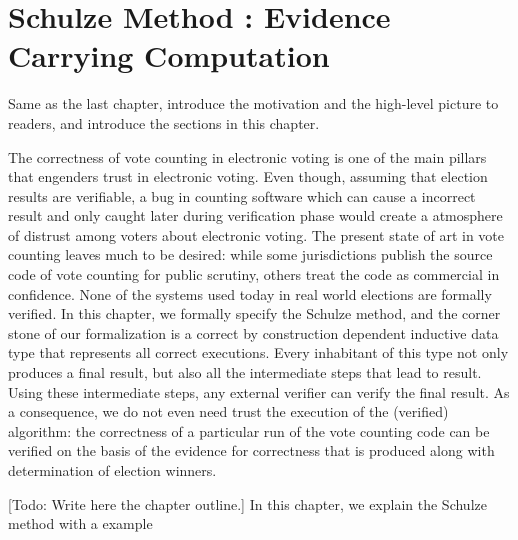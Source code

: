 \chapter{Schulze Method : Evidence Carrying Computation}
\label{cha:schulze_method}
Same as the last chapter, introduce the motivation and the high-level picture to
readers, and introduce the sections in this chapter.

 The correctness of vote counting in electronic voting is one of 
 the main pillars that engenders trust in electronic voting. Even 
 though, assuming 
 that election results are verifiable, a bug in 
 counting software which can cause a incorrect result and only 
 caught later during verification phase would create a atmosphere of 
 distrust among voters about electronic voting. The present state of 
 art in vote counting leaves much to be desired: while some 
 jurisdictions publish the source code of vote counting for 
 public scrutiny, others treat the code as commercial in confidence. 
 None of the systems used today in real world elections are 
 formally verified. In this chapter, we formally specify the 
 Schulze method, and the corner stone of our formalization is 
 a correct by construction dependent inductive data type 
 that represents all correct executions. Every inhabitant of 
 this type not only produces a final result, but also 
 all the intermediate steps that lead to result. Using these 
 intermediate steps, any external verifier can verify the 
 final result. As a consequence, we do not even need trust the
  execution of the (verified) algorithm: the correctness of 
  a particular run of the vote counting code can be verified on
  the basis of the evidence for correctness that is produced
  along with determination of election winners.
  
  [Todo: Write here the chapter outline.]
  In this chapter, we explain the Schulze method with a example


